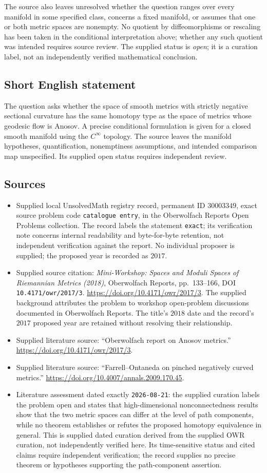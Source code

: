 \documentclass[11pt]{article}
\begin{document}
The source also leaves unresolved whether the question ranges over every manifold in some specified class, concerns a fixed manifold, or assumes that one or both metric spaces are nonempty. No quotient by diffeomorphisms or rescaling has been taken in the conditional interpretation above; whether any such quotient was intended requires source review. The supplied status is \emph{open}; it is a curation label, not an independently verified mathematical conclusion.
\subsection{Short English statement}
The question asks whether the space of smooth metrics with strictly negative sectional curvature has the same homotopy type as the space of metrics whose geodesic flow is Anosov. A precise conditional formulation is given for a closed smooth manifold using the \(C^{\infty}\) topology. The source leaves the manifold hypotheses, quantification, nonemptiness assumptions, and intended comparison map unspecified. Its supplied open status requires independent review.
\subsection{Sources}
\begin{itemize}
\item Supplied local UnsolvedMath registry record, permanent ID \(30003349\), exact source problem code \texttt{catalogue entry}, in the Oberwolfach Reports Open Problems collection. The record labels the statement \texttt{exact}; its verification note concerns internal readability and byte-for-byte retention, not independent verification against the report. No individual proposer is supplied; the proposed year is recorded as \(2017\).
\item Supplied source citation: \emph{Mini-Workshop: Spaces and Moduli Spaces of Riemannian Metrics (2018)}, Oberwolfach Reports, pp.\ 133--166, DOI \texttt{10.4171/owr/2017/3}. \url{https://doi.org/10.4171/owr/2017/3}. The supplied background attributes the problem to workshop open-problem discussions documented in Oberwolfach Reports. The title's \(2018\) date and the record's \(2017\) proposed year are retained without resolving their relationship.
\item Supplied literature source: ``Oberwolfach report on Anosov metrics.'' \url{https://doi.org/10.4171/owr/2017/3}.
\item Supplied literature source: ``Farrell--Ontaneda on pinched negatively curved metrics.'' \url{https://doi.org/10.4007/annals.2009.170.45}.
\item Literature assessment dated exactly \texttt{2026-08-21}: the supplied curation labels the problem open and states that high-dimensional nonconnectedness results show that the two metric spaces can differ at the level of path components, while no theorem establishes or refutes the proposed homotopy equivalence in general. This is supplied dated curation derived from the supplied OWR curation, not independently verified here. Its time-sensitive status and cited claims require independent verification; the record supplies no precise theorem or hypotheses supporting the path-component assertion.
\end{itemize}
\end{document}
